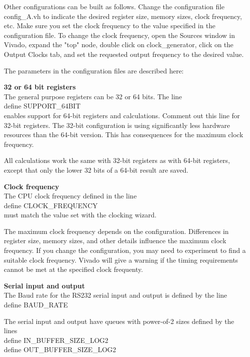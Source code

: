 \documentclass[11pt,a4paper,oneside,openright]{report}
\newcommand{\vv}{ \vspace{2mm} }   %
\begin{document}
Other configurations can be built as follows. 
Change the configuration file config\_A.vh to indicate the desired register size, memory sizes, clock frequency, etc. 
Make sure you set the clock frequency to the value specified in the configuration file. To change the clock frequency, open the Sources window in Vivado, expand the "top" node, double click on clock\_generator, click on the Output Clocks tab, and set the requested output frequency to the desired value.
\vv

The parameters in the configuration files are described here:
\vv
\vv

\textbf{32 or 64 bit registers} \\
The general purpose registers can be 32 or 64 bits. The line\\
\hspace{10mm} \textasciigrave define SUPPORT\_64BIT \\
enables support for 64-bit registers and calculations. Comment out this line for 32-bit registers. The 32-bit configuration is using significantly less hardware resources than the 64-bit version. This has consequences for the maximum clock frequency.
\vv

All calculations work the same with 32-bit registers as with 64-bit registers, except that only the lower 32 bits of a 64-bit result are saved.
\vv
\vv

\textbf{Clock frequency} \\
The CPU clock frequency defined in the line \\
\hspace{10mm} \textasciigrave define CLOCK\_FREQUENCY \\
must match the value set with the clocking wizard.
\vv

The maximum clock frequency depends on the configuration. Differences in register size, memory sizes, and other details influence the maximum clock frequency.  
If you change the configuration, you may need to experiment to find a suitable clock frequency. Vivado will give a warning if the timing requirements cannot be met at the specified clock frequenty. 
\vv 
\vv


\textbf{Serial input and output} \\
The Baud rate for the RS232 serial input and output is defined by the line \\
\hspace{10mm} \textasciigrave define BAUD\_RATE \\
\vv

The serial input and output have queues with power-of-2 sizes defined by the lines \\
\hspace{10mm} \textasciigrave define IN\_BUFFER\_SIZE\_LOG2 \\
\hspace{10mm} \textasciigrave define OUT\_BUFFER\_SIZE\_LOG2 \\
\vv 
\vv
\end{document}
